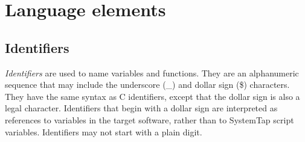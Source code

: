 \documentclass[twoside,english]{article}
\begin{document}
\begin{comment} %
\subsection{Probes to monitor performance}

The perfmon family of probe points is used to access the performance monitoring
hardware available in modern processors. These probe points require perfmon2
support in the kernel to access the hardware.

Performance monitor hardware points have a \texttt{perfmon} prefix. The suffix
names the event being counted, for example \texttt{counter(event)}. The event
names are specific to the processor implementation, except for generic cycle
and instructions events, which are available on all processors. The probe
\texttt{perfmon.counter(event)} starts a counter on the processor which counts
the number of events that occur on that processor. For more details about
the performance monitoring events available on a specific processor, see
the help text returned by typing the perfmon2 command \texttt{pfmon -l.}

\subsubsection{\$counter}

\$counter is a handle used in the body of a probe for operations involving
the counter associated with the probe.

\subsubsection{read\_counter}

read\_counter is a function passed to the handle for a perfmon probe. It
returns the current count for the event.
\end{comment}

\section{Language elements\label{sec:Language-Elements}}


\subsection{Identifiers}
\emph{Identifiers} are used to name variables and functions. They are an
alphanumeric sequence that may include the underscore (\_) and dollar sign
(\$) characters. They have the same syntax as C identifiers, except that
the dollar sign is also a legal character. Identifiers that begin with a
dollar sign are interpreted as references to variables in the target software,
rather than to SystemTap script variables. Identifiers may not start with
a plain digit. 
\end{document}
